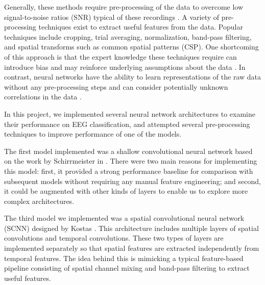 \documentclass[10pt,twocolumn,letterpaper]{article}
\begin{document}
Generally, these methods require pre-processing of the data to overcome low
signal-to-noise ratios (SNR) typical of these recordings
\cite{kostas2019machine}.
A variety of pre-processing techniques exist to extract useful features from the
data. Popular techniques include cropping, trial averaging, normalization,
band-pass filtering, and spatial transforms such as common spatial patterns
(CSP). One shortcoming of this approach is that the expert knowledge these
techniques require can introduce bias and may reinforce underlying assumptions
about the data \cite{kostas2019machine}.
In contrast, neural networks have the ability to learn representations of the
raw data without any pre-processing steps and can consider potentially unknown
correlations in the data \cite{kostas2019machine}.

In this project, we implemented several neural network architectures to examine
their performance on EEG classification, and attempted several pre-processing
techniques to improve performance of one of the models.

The first model implemented was a shallow convolutional neural network
based on the work by Schirrmeister \etal in \cite{DBLP}. There were two main
reasons for implementing this model: first, it provided a strong performance
baseline for comparison with subsequent models without requiring any manual
feature engineering; and second, it could be augmented with other kinds of
layers to enable us to explore more complex architectures.


The third model we implemented was a spatial convolutional neural network
(SCNN) designed by Kostas \etal \cite{kostas2019machine}. This architecture
includes multiple layers of spatial convolutions and temporal convolutions.
These two types of layers are implemented separately so that spatial features
are extracted independently from temporal features. The idea behind this is
mimicking a typical feature-based pipeline consisting of spatial channel mixing
and band-pass filtering to extract useful features.
\end{document}
